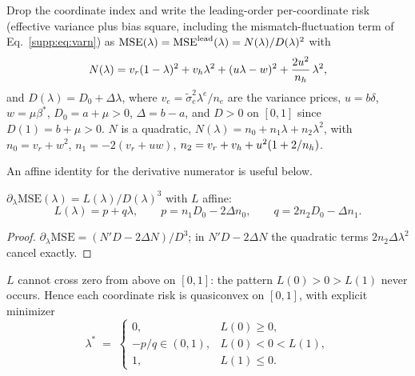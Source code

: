 Drop the coordinate index and write the leading-order per-coordinate risk (effective variance plus bias square, including the mismatch-fluctuation term of Eq.~\eqref{supp:eq:varn}) as $\mathrm{MSE}(\lambda) = \mathrm{MSE}^{\mathrm{lead}}(\lambda) = N(\lambda)/D(\lambda)^2$ with
\begin{equation}
N(\lambda) = v_r(1-\lambda)^2 + v_h\lambda^2 + (u\lambda - w)^2 + \frac{2u^2}{n_h}\,\lambda^2,
\end{equation}
and $D(\lambda) = D_0 + \Delta \lambda$, where $v_e = \tilde\sigma_e^2 \lambda^e / n_e$ are the variance prices, $u = b\delta$, $w = \mu\beta^*$, $D_0 = a + \mu > 0$, $\Delta = b - a$, and $D > 0$ on $[0,1]$ since $D(1) = b + \mu > 0$.
$N$ is a quadratic, $N(\lambda) = n_0 + n_1\lambda + n_2\lambda^2$, with $n_0 = v_r + w^2$, $n_1 = -2(v_r + uw)$, $n_2 = v_r + v_h + u^2(1 + 2/n_h)$.

An affine identity for the derivative numerator is useful below.
\begin{lemma}\label{supp:lem:affine}
$\partial_\lambda \mathrm{MSE}(\lambda) = L(\lambda)/D(\lambda)^3$ with $L$ affine:
\begin{equation}
L(\lambda) = p + q\lambda,
\qquad
p = n_1 D_0 - 2\Delta n_0,
\qquad
q = 2 n_2 D_0 - \Delta n_1 .
\end{equation}
\end{lemma}

\begin{proof}
$\partial_\lambda \mathrm{MSE} = (N' D - 2\Delta N)/D^3$; in $N'D - 2\Delta N$ the quadratic terms $2 n_2 \Delta \lambda^2$ cancel exactly.
\end{proof}

\begin{proposition}\label{supp:prop:nomax}
$L$ cannot cross zero from above on $[0,1]$: the pattern $L(0) > 0 > L(1)$ never occurs.
Hence each coordinate risk is quasiconvex on $[0,1]$, with explicit minimizer
\begin{equation}
\lambda^* \;=\; \begin{cases}
0, & L(0) \ge 0,\\[2pt]
-p/q \in (0,1), & L(0) < 0 < L(1),\\[2pt]
1, & L(1) \le 0 .
\end{cases}
\label{supp:eq:lamstar}
\end{equation}
\end{proposition}

